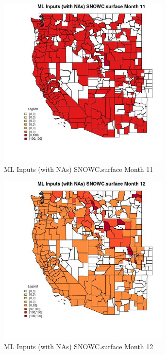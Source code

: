\begin{figure} 
\centering  
\includegraphics[width=0.77\textwidth]{Code_Outputs/Report_ML_input_PM25_Step4_part_e_de_duplicated_aves_compiled_2019-05-21wNAs_CountySNOWCsurfacemedianMonth11.jpg} 
\caption{\label{fig:Report_ML_input_PM25_Step4_part_e_de_duplicated_aves_compiled_2019-05-21wNAsCountySNOWCsurfacemedianMonth11}ML Inputs (with NAs) SNOWC.surface Month 11} 
\end{figure} 
 

\begin{figure} 
\centering  
\includegraphics[width=0.77\textwidth]{Code_Outputs/Report_ML_input_PM25_Step4_part_e_de_duplicated_aves_compiled_2019-05-21wNAs_CountySNOWCsurfacemedianMonth12.jpg} 
\caption{\label{fig:Report_ML_input_PM25_Step4_part_e_de_duplicated_aves_compiled_2019-05-21wNAsCountySNOWCsurfacemedianMonth12}ML Inputs (with NAs) SNOWC.surface Month 12} 
\end{figure} 
 

